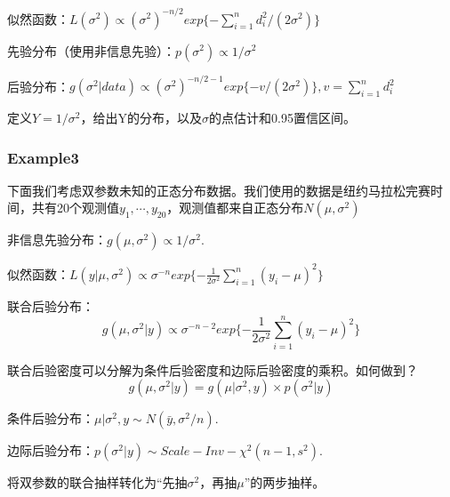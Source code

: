 \documentclass[
]{book}
\begin{document}
似然函数：\(L(\sigma^2)\propto (\sigma^2)^{-n/2}exp\{-\sum_{i=1}^nd_i^2/(2\sigma^2) \}\)

先验分布（使用非信息先验）：\(p(\sigma^2)\propto 1/\sigma^2\)

后验分布：\(g(\sigma^2|data)\propto (\sigma^2)^{-n/2-1}exp\{-v/(2\sigma^2)\},v=\sum_{i=1}^nd_i^2\)

定义\(Y=1/\sigma^2\)，给出Y的分布，以及\(\sigma\)的点估计和0.95置信区间。

\subsubsection{Example3}\label{example3}

下面我们考虑双参数未知的正态分布数据。我们使用的数据是纽约马拉松完赛时间，共有20个观测值\(y_1,\cdots,y_{20}\)，观测值都来自正态分布\(N(\mu,\sigma^2)\)

非信息先验分布：\(g(\mu,\sigma^2)\propto 1/\sigma^2\).

似然函数：\(L(y|\mu,\sigma^2) \propto \sigma^{-n}exp\{-\frac{1}{2\sigma^2}\sum_{i=1}^n(y_i-\mu)^2\}\)

联合后验分布： \[
g(\mu,\sigma^2|y)\propto \sigma^{-n-2}exp\{-\frac{1}{2\sigma^2}\sum_{i=1}^n(y_i-\mu)^2 \}
\]

联合后验密度可以分解为条件后验密度和边际后验密度的乘积。如何做到？ \[
g(\mu,\sigma^2|y)=g(\mu|\sigma^2,y)\times p(\sigma^2|y)
\]

条件后验分布：\(\mu|\sigma^2,y \sim N(\bar{y},\sigma^2/n)\).

边际后验分布：\(p(\sigma^2|y) \sim Scale-Inv-\chi^2(n-1,s^2)\).

将双参数的联合抽样转化为``先抽\(\sigma^2\)，再抽\(\mu\)''的两步抽样。
\end{document}

